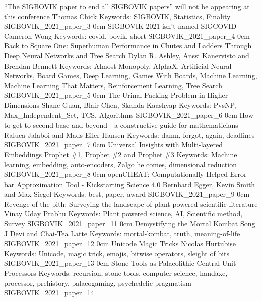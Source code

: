 \addpaper
	{``The SIGBOVIK paper to end all SIGBOVIK papers'' will not be appearing at this conference}
	{Thomas Chick}
	{Keywords: SIGBOVIK, Statistics, Finality}
	{SIGBOVIK_2021_paper_3}
	{0cm}
	{}
\addpaper
	{SIGBOVIK 2021 isn't named SIGCOVID}
	{Cameron Wong}
	{Keywords: covid, bovik, short}
	{SIGBOVIK_2021_paper_4}
	{0cm}
	{}
\addpaper
	{Back to Square One: Superhuman Performance in Chutes and Ladders Through Deep Neural Networks and Tree Search}
	{Dylan R. Ashley, Anssi Kanervisto and Brendan Bennett}
	{Keywords: Almost Monopoly, AlphaX, Artificial Neural Networks, Board Games, Deep Learning, Games With Boards, Machine Learning, Machine Learning That Matters, Reinforcement Learning, Tree Search}
	{SIGBOVIK_2021_paper_5}
	{0cm}
	{}
\addpaper
	{The Urinal Packing Problem in Higher Dimensions}
	{Shane Guan, Blair Chen, Skanda Kaashyap}
	{Keywords: PvsNP, Max\_Independent\_Set, TCS, Algorithms}
	{SIGBOVIK_2021_paper_6}
	{0cm}
	{}
\addpaper
	{How to get to second base and beyond - a constructive guide for mathematicians}
	{Raluca Jalaboi and Mads Eiler Hansen}
	{Keywords: damn, forgot, again, deadlines}
	{SIGBOVIK_2021_paper_7}
	{0cm}
	{}
\addpaper
	{Universal Insights with Multi-layered Embeddings}
	{Prophet \#1, Prophet \#2 and Prophet \#3}
	{Keywords: Machine learning, embedding, auto-encoders, Zalgo he comes, dimensional reduction}
	{SIGBOVIK_2021_paper_8}
	{0cm}
	{}
\addpaper
	{openCHEAT: Computationally Helped Error bar Approximation Tool - Kickstarting Science 4.0}
	{Bernhard Egger, Kevin Smith and Max Siegel} %
	{Keywords: best, paper, award}
	{SIGBOVIK_2021_paper_9}
	{0cm}
	{}
\addpaper
	{Revenge of the pith: Surveying the landscape of plant-powered scientific literature}
	{Vinay Uday Prabhu}
	{Keywords: Plant powered science, AI, Scientific method, Survey}
	{SIGBOVIK_2021_paper_11}
	{0cm}
	{}
\addpaper
	{Demystifying the Mortal Kombat Song}
	{J Devi and Chai-Tea Latte}
	{Keywords: mortal-kombat, truth, meaning-of-life}
	{SIGBOVIK_2021_paper_12}
	{0cm}
	{}
\addpaper
	{Unicode Magic Tricks}
	{Nicolas Hurtubise}
	{Keywords: Unicode, magic trick, emojis, bitwise operators, sleight of bits}
	{SIGBOVIK_2021_paper_13}
	{0cm}
	{}
\addpaper
	{Stone Tools as Palaeolithic Central Unit Processors}
	{}
	{Keywords: recursion, stone tools, computer science, handaxe, processor, prehistory, palaeogaming, psychedelic pragmatism}
	{SIGBOVIK_2021_paper_14}
